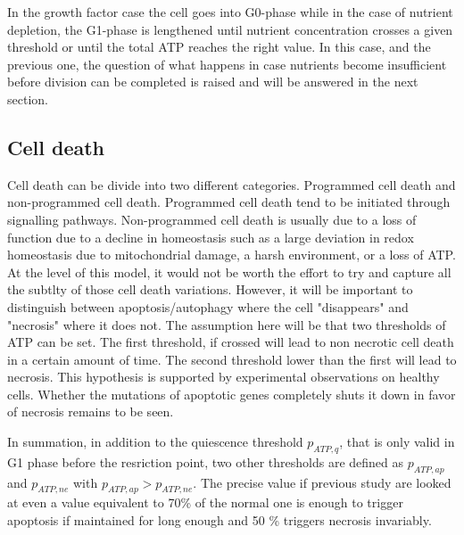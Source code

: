 \documentclass[11pt,a4paper]{article}
\begin{document}
In the growth factor case the cell goes into G0-phase while in the case of nutrient  depletion, the G1-phase is lengthened until nutrient concentration crosses a given threshold or until the total ATP reaches the right value. In this case, and the previous one, the question of what happens in case nutrients become insufficient before division can be completed is raised and will be answered in the next section.

\subsection{Cell death}
Cell death can be divide into  two different categories. Programmed cell death and non-programmed cell death. Programmed cell death tend to be initiated through signalling pathways. Non-programmed cell death is usually due to a loss of function due to a decline in homeostasis such as a large deviation in redox homeostasis due to mitochondrial damage, a harsh environment, or a loss of ATP. At the level of this model, it would not be worth the effort to try and capture all the subtlty of those cell death variations. However, it will be important to distinguish between apoptosis/autophagy where the cell "disappears" and "necrosis" where it does not. The assumption here will be that two thresholds of ATP can be set. The first threshold, if crossed will lead to non necrotic cell death in a certain amount of time. The second threshold lower than the first will lead to necrosis. This  hypothesis is supported by experimental observations on healthy cells. \cite{Lieberthal1998}\cite{Why1999} \cite{Yee2021} Whether the mutations of apoptotic genes completely shuts it down in favor of necrosis remains to be seen.

In summation, in addition to the quiescence threshold $p_{ATP,q}$, that is only valid in G1 phase before the resriction point, two  other thresholds are defined as $p_{ATP,ap}$ and $p_{ATP,ne}$ with  $p_{ATP,ap} > p_{ATP,ne}$. The precise value if previous study are looked at even a value equivalent to 70\% of the normal one is enough to trigger apoptosis if maintained for long enough and 50 \% triggers necrosis invariably.\cite{Lieberthal1998}
\end{document}
